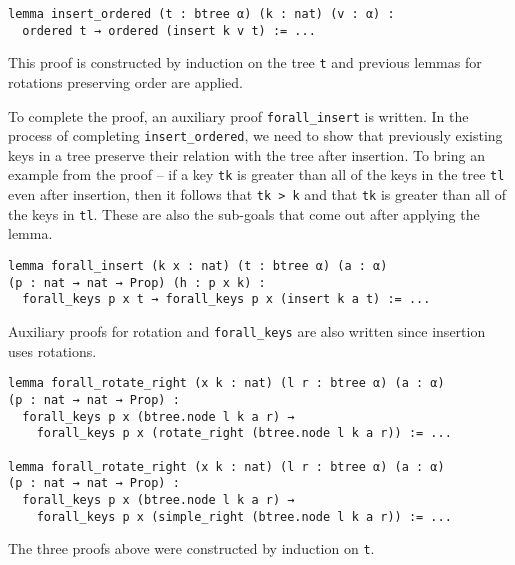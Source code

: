 \begin{lstlisting}
lemma insert_ordered (t : btree α) (k : nat) (v : α) :
  ordered t → ordered (insert k v t) := ...
\end{lstlisting}

This proof is constructed by induction on the tree \lstinline{t} and previous lemmas for rotations preserving order are applied. 

To complete the proof, an auxiliary proof \lstinline{forall_insert} is written. In the process of completing \lstinline{insert_ordered}, we need to show that previously existing keys in a tree preserve their relation with the tree after insertion. To bring an example from the proof -- if a key \lstinline{tk} is greater than all of the keys in the tree \lstinline{tl} even after insertion, then it follows that \lstinline{tk > k} and that \lstinline{tk} is greater than all of the keys in \lstinline{tl}. These are also the sub-goals that come out after applying the lemma. 

\begin{lstlisting}
lemma forall_insert (k x : nat) (t : btree α) (a : α) 
(p : nat → nat → Prop) (h : p x k) :
  forall_keys p x t → forall_keys p x (insert k a t) := ...
\end{lstlisting}

Auxiliary proofs for rotation and \lstinline{forall_keys} are also written since insertion uses rotations.

\begin{lstlisting}
lemma forall_rotate_right (x k : nat) (l r : btree α) (a : α) 
(p : nat → nat → Prop) :
  forall_keys p x (btree.node l k a r) → 
    forall_keys p x (rotate_right (btree.node l k a r)) := ...

lemma forall_rotate_right (x k : nat) (l r : btree α) (a : α) 
(p : nat → nat → Prop) :
  forall_keys p x (btree.node l k a r) → 
    forall_keys p x (simple_right (btree.node l k a r)) := ...
\end{lstlisting}

The three proofs above were constructed by induction on \lstinline{t}.